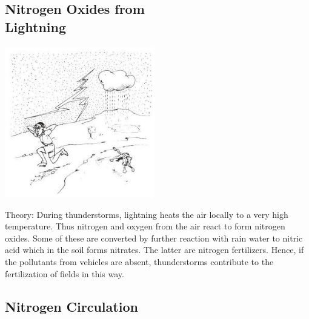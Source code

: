 \begin{multicols}{2}
\subsection{Nitrogen Oxides from \hfill \\ Lightning}

\begin{center}
\includegraphics[width=0.49\textwidth]{./img/source/nitrogen-lightning-2.jpg}
\end{center}

\begin{description*}
\item[Theory:]{During thunderstorms, lightning heats
the air locally to a very high temperature. Thus
nitrogen and oxygen from the air react to form
nitrogen oxides. Some of these are converted by
further reaction with rain water to nitric acid
which in the soil forms nitrates. The latter are
nitrogen fertilizers. Hence, if the pollutants
from vehicles are absent,
thunderstorms contribute to the fertilization of
fields in this way.}
\end{description*}

\columnbreak

\subsection{Nitrogen Circulation}


\end{multicols}
